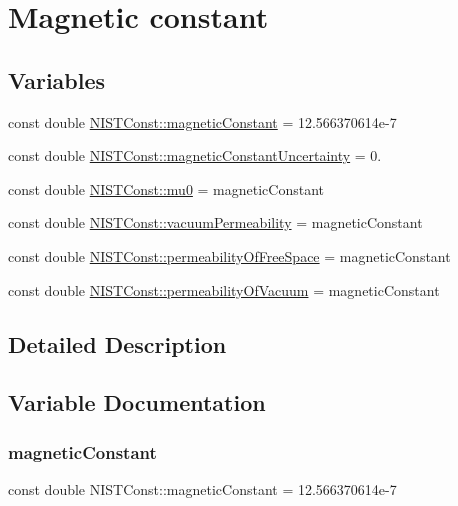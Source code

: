 \hypertarget{group___magnetic_constant}{}\section{Magnetic constant}
\label{group___magnetic_constant}
\subsection*{Variables}
\begin{DoxyCompactItemize}
\item 
const double \hyperlink{group___magnetic_constant_ga511860d1f2830ae6a85e1b1df8522071}{N\+I\+S\+T\+Const\+::magnetic\+Constant} = 12.\+566370614e-\/7
\item 
const double \hyperlink{group___magnetic_constant_ga17f91f2aa414afe44a0bc84825034a4e}{N\+I\+S\+T\+Const\+::magnetic\+Constant\+Uncertainty} = 0.
\item 
const double \hyperlink{group___magnetic_constant_gaee4806f14e9b0f48347b2d29ddcd2668}{N\+I\+S\+T\+Const\+::mu0} = magnetic\+Constant
\item 
const double \hyperlink{group___magnetic_constant_ga2bf51bbe9c6b75752250c9b133758223}{N\+I\+S\+T\+Const\+::vacuum\+Permeability} = magnetic\+Constant
\item 
const double \hyperlink{group___magnetic_constant_gad7321a170873a7532ecfb8383d827d1e}{N\+I\+S\+T\+Const\+::permeability\+Of\+Free\+Space} = magnetic\+Constant
\item 
const double \hyperlink{group___magnetic_constant_ga7210c41dfc8fb9dbc41c83282eafebc6}{N\+I\+S\+T\+Const\+::permeability\+Of\+Vacuum} = magnetic\+Constant
\end{DoxyCompactItemize}


\subsection{Detailed Description}


\subsection{Variable Documentation}
\mbox{\label{group___magnetic_constant_ga511860d1f2830ae6a85e1b1df8522071}} 
\subsubsection{\texorpdfstring{magnetic\+Constant}{magneticConstant}}
{\footnotesize\ttfamily const double N\+I\+S\+T\+Const\+::magnetic\+Constant = 12.\+566370614e-\/7}

